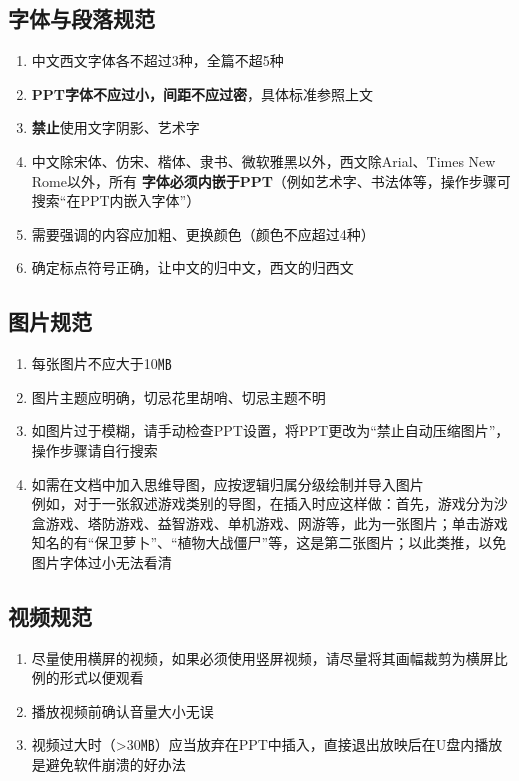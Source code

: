 \subsection[字体与段落规范]{字体与段落规范}
\begin{enumerate}
    \item 中文西文字体各不超过3种，全篇不超5种
    \item \textbf{PPT字体不应过小，间距不应过密}，具体标准参照上文
    \item \textbf{禁止}使用文字阴影、艺术字
    \item 中文除宋体、仿宋、楷体、隶书、微软雅黑以外，西文除Arial、Times New Rome以外，所有 \textbf{字体必须内嵌于PPT}（例如艺术字、书法体等，操作步骤可搜索“在PPT内嵌入字体”）
    \item 需要强调的内容应加粗、更换颜色（颜色不应超过4种）
    \item 确定标点符号正确，让中文的归中文，西文的归西文
\end{enumerate}

\subsection[图片规范]{图片规范}
\begin{enumerate}
    \item 每张图片不应大于10㎆\footnotemark
    \item 图片主题应明确，切忌花里胡哨、切忌主题不明
    \item 如图片过于模糊，请手动检查PPT设置，将PPT更改为“禁止自动压缩图片”，操作步骤请自行搜索
    \item 如需在文档中加入思维导图，应按逻辑归属分级绘制并导入图片\\
          例如，对于一张叙述游戏类别的导图，在插入时应这样做：首先，游戏分为沙盒游戏、塔防游戏、益智游戏、单机游戏、网游等，此为一张图片；单击游戏知名的有“保卫萝卜”、“植物大战僵尸”等，这是第二张图片；以此类推，以免图片字体过小无法看清
\end{enumerate}

\subsection[视频规范]{视频规范}
\begin{enumerate}
    \item 尽量使用横屏的视频，如果必须使用竖屏视频，请尽量将其画幅裁剪为横屏比例的形式以便观看
    \item 播放视频前确认音量大小无误
    \item 视频过大时（>30㎆）应当放弃在PPT中插入，直接退出放映后在U盘内播放是避免软件崩溃的好办法
\end{enumerate}

